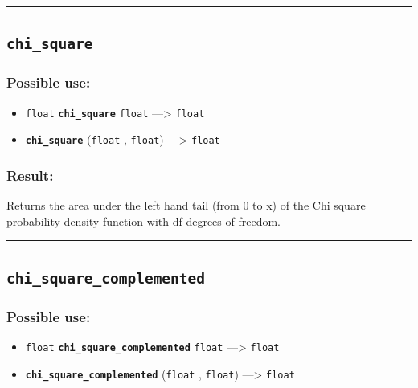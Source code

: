 \documentclass[]{book}
\providecommand{\tightlist}{%
  \setlength{\itemsep}{0pt}\setlength{\parskip}{0pt}}
\theoremstyle{definition}
\theoremstyle{definition}
\theoremstyle{definition}
\theoremstyle{remark}
\begin{document}
\begin{center}\rule{0.5\linewidth}{\linethickness}\end{center}

\subsection{\texorpdfstring{\texttt{chi\_square}}{chi\_square}}\label{chi_square}

\subsubsection{Possible use:}\label{possible-use-83}

\begin{itemize}
\tightlist
\item
  \texttt{float} \textbf{\texttt{chi\_square}} \texttt{float}
  ---\textgreater{} \texttt{float}
\item
  \textbf{\texttt{chi\_square}} (\texttt{float} , \texttt{float})
  ---\textgreater{} \texttt{float}
\end{itemize}

\subsubsection{Result:}\label{result-81}

Returns the area under the left hand tail (from 0 to x) of the Chi
square probability density function with df degrees of freedom.

\begin{center}\rule{0.5\linewidth}{\linethickness}\end{center}

\subsection{\texorpdfstring{\texttt{chi\_square\_complemented}}{chi\_square\_complemented}}\label{chi_square_complemented}

\subsubsection{Possible use:}\label{possible-use-84}

\begin{itemize}
\tightlist
\item
  \texttt{float} \textbf{\texttt{chi\_square\_complemented}}
  \texttt{float} ---\textgreater{} \texttt{float}
\item
  \textbf{\texttt{chi\_square\_complemented}} (\texttt{float} ,
  \texttt{float}) ---\textgreater{} \texttt{float}
\end{itemize}
\end{document}
